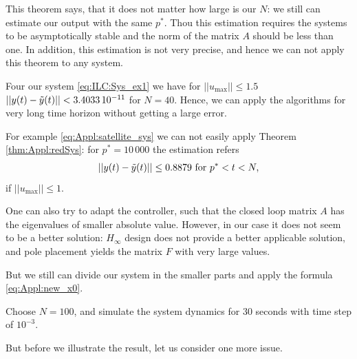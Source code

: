 	This theorem says, that it does not matter how large is our $N$: we still can estimate our output with the same $p^*$. 
	Thou this estimation requires the systems to be asymptotically stable and the norm of the matrix $A$ should be less than one. In addition, this estimation is not very precise, and hence we can not apply this theorem to any system. 
	
	\begin{exam}
		Four our system \eqref{eq:ILC:Sys_ex1} we have for $||u_{\max}||\leq 1.5$ 
		$||y(t) - \tilde{y}(t)|| < 3.4033\, 10^{-11}$ for $N = 40$. Hence, we can apply the algorithms for very long time horizon without getting a large error. 
	\end{exam}

\begin{exam}
	\label{ex:Appl:redN}
	For example \eqref{eq:Appl:satellite_sys} we can not easily apply Theorem \ref{thm:Appl:redSys}: for $p^* = 10 \, 000 $ the estimation refers 
	\begin{align}
	||y(t) - \tilde{y}(t)|| \leq 0.8879 \text{ for } p^* < t < N,
	\end{align}
	if $||u_{\max}|| \leq 1$.
	
	One can also try to adapt the controller, such that the closed loop matrix $A$ has the eigenvalues of smaller absolute value. However, in our case it does not seem to be a better solution: $H_\infty$ design does not provide a better applicable solution, and pole placement yields the matrix $F$ with very large values. 
	
	But we still can divide our system in the smaller parts and apply the formula \eqref{eq:Appl:new_x0}. 
	
	Choose $N = 100$, and simulate the system dynamics for 30 seconds with time step of $10^{-3}$. 

But before we illustrate the result, let us consider one more issue. 
	
	
\end{exam}

